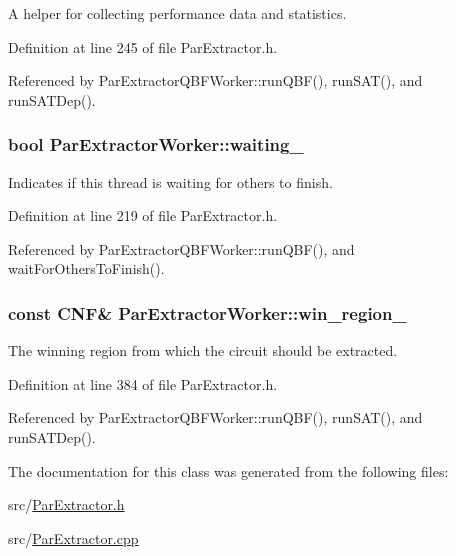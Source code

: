 A helper for collecting performance data and statistics. 



Definition at line 245 of file Par\-Extractor.\-h.



Referenced by Par\-Extractor\-Q\-B\-F\-Worker\-::run\-Q\-B\-F(), run\-S\-A\-T(), and run\-S\-A\-T\-Dep().

\hypertarget{classParExtractorWorker_aad63a07af4e70719e53a4c41d67b6dd1}{
\subsubsection[{waiting\-\_\-}]{\setlength{\rightskip}{0pt plus 5cm}bool Par\-Extractor\-Worker\-::waiting\-\_\-}}\label{classParExtractorWorker_aad63a07af4e70719e53a4c41d67b6dd1}


Indicates if this thread is waiting for others to finish. 



Definition at line 219 of file Par\-Extractor.\-h.



Referenced by Par\-Extractor\-Q\-B\-F\-Worker\-::run\-Q\-B\-F(), and wait\-For\-Others\-To\-Finish().

\hypertarget{classParExtractorWorker_abccf0d629d4dca3a94cc572130e6d0e9}{
\subsubsection[{win\-\_\-region\-\_\-}]{\setlength{\rightskip}{0pt plus 5cm}const {\bf C\-N\-F}\& Par\-Extractor\-Worker\-::win\-\_\-region\-\_\-\hspace{0.3cm}{\ttfamily [protected]}}}\label{classParExtractorWorker_abccf0d629d4dca3a94cc572130e6d0e9}


The winning region from which the circuit should be extracted. 



Definition at line 384 of file Par\-Extractor.\-h.



Referenced by Par\-Extractor\-Q\-B\-F\-Worker\-::run\-Q\-B\-F(), run\-S\-A\-T(), and run\-S\-A\-T\-Dep().



The documentation for this class was generated from the following files\-:\begin{DoxyCompactItemize}
\item 
src/\hyperlink{ParExtractor_8h}{Par\-Extractor.\-h}\item 
src/\hyperlink{ParExtractor_8cpp}{Par\-Extractor.\-cpp}\end{DoxyCompactItemize}
